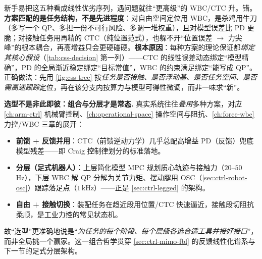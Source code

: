 \begin{pitfall}
新手易把这五种看成线性优劣序列，遇问题就往“更高级”的 WBC/CTC 升。错。\textbf{方案匹配的是任务结构，不是先进程度}：对自由空间定位用 WBC，是杀鸡用牛刀（多写一个 QP、多担一份不可行风险、多调一堆权重），且对模型误差比 PD 更脆；对接触任务用再精的 CTC（纯位置范式），也躲不开“位置误差 $\to$ 力尖峰”的根本耦合，再高增益只会更硬碰硬。\textbf{根本原因}：每种方案的理论保证都\emph{绑定其核心假设}（\cref{tab:css-decision} 第一列）——CTC 的线性误差动态绑定“模型精确”，PD 的全局渐近稳定绑定“目标常值”，WBC 的约束满足绑定“能写成 QP”。正确做法：先用 \cref{fig:css-tree} 按\emph{任务是否接触、是否浮动基、是否任务空间、是否需高速跟踪}定位，再在该分支内按算力与模型可得性微调，而非一味求“新”。
\end{pitfall}

\begin{note}
\textbf{选型不是非此即彼：组合与分层才是常态.}\;
真实系统往往\emph{叠用}多种方案，对应 \cref{ch:arm-ctrl} 机械臂控制、\cref{ch:operational-space} 操作空间与阻抗、\cref{ch:force-wbc} 力控/WBC 三章的展开：
\begin{itemize}
  \item \textbf{前馈 + 反馈并用}：CTC（前馈逆动力学）几乎总配高增益 PD（反馈）兜底模型残差——即 Craig 控制律划分的标准落地。
  \item \textbf{分层（足式机器人）}：上层简化模型 MPC 规划质心轨迹与接触力（$20$--$50$\,Hz），下层 WBC 解 QP 分解为关节力矩、摆动腿用 OSC（\cref{sec:ctrl-robot-osc}）跟踪落足点（$1$\,kHz）——正是 \cref{sec:ctrl-legged} 的架构。
  \item \textbf{自由 + 接触切换}：装配任务在趋近段用位置/CTC 快速逼近，接触段切阻抗柔顺，是工业力控的常见状态机。
\end{itemize}
故“选型”更准确地说是“\emph{为任务的每个阶段、每个层级各选合适工具并接好接口}”，而非全局挑一个赢家。这一组合哲学贯穿 \cref{sec:ctrl-mimo-fbl} 的反馈线性化谱系与下一节的足式分层架构。
\end{note}


